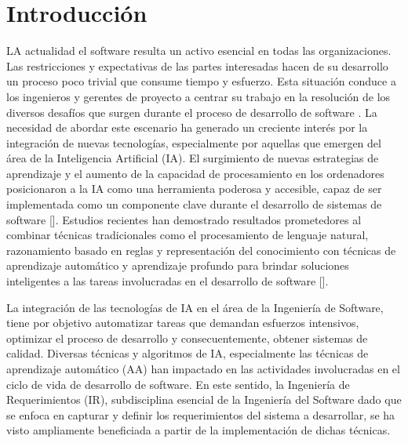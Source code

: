 \documentclass[journal]{IEEEtran}
\begin{document}
\section{Introducci\'on}
% 
% 
% 
% 
 LA actualidad el software resulta un activo esencial en todas las organizaciones. Las restricciones y expectativas de las partes interesadas hacen de su desarrollo un proceso poco trivial que consume tiempo y esfuerzo. Esta situación conduce a los ingenieros y gerentes de proyecto a centrar su trabajo en la resolución de los diversos desafíos que surgen durante el proceso de desarrollo de software \cite{Asghar2010}. La necesidad de abordar este escenario ha generado un creciente interés por la integración de nuevas tecnologías, especialmente por aquellas que emergen del área de la Inteligencia Artificial (IA). El surgimiento de nuevas estrategias de aprendizaje y el aumento de la capacidad de procesamiento en los ordenadores posicionaron a la IA como una herramienta poderosa y accesible, capaz de ser implementada como un componente clave durante el desarrollo de sistemas de software []. Estudios recientes han demostrado resultados prometedores al combinar técnicas tradicionales como el procesamiento de lenguaje natural, razonamiento basado en reglas y representación del conocimiento con técnicas de aprendizaje automático y aprendizaje profundo para brindar soluciones inteligentes a las tareas involucradas en el desarrollo de software []. 

La integración de las tecnologías de IA en el área de la Ingeniería de Software, tiene por objetivo automatizar tareas que demandan esfuerzos intensivos, optimizar el proceso de desarrollo y consecuentemente, obtener sistemas de calidad. Diversas técnicas y algoritmos de IA, especialmente las técnicas de aprendizaje automático (AA) han impactado en las actividades involucradas en el ciclo de vida de desarrollo de software. En este sentido, la Ingeniería de Requerimientos (IR), subdisciplina esencial de la Ingeniería del Software dado que se enfoca en capturar y definir los requerimientos del sistema a desarrollar, se ha visto ampliamente beneficiada a partir de la implementación de dichas técnicas. 
\end{document}
